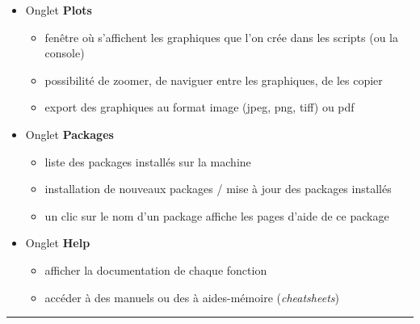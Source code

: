 \documentclass[
  french,
  10pt,
  a4paper,
]{article}
\providecommand{\tightlist}{%
  \setlength{\itemsep}{0pt}\setlength{\parskip}{0pt}}
\begin{document}
\begin{itemize}
\item
  Onglet \textbf{Plots}

  \begin{itemize}
  \tightlist
  \item
    fenêtre où s'affichent les graphiques que l'on crée dans les scripts
    (ou la console)
  \item
    possibilité de zoomer, de naviguer entre les graphiques, de les
    copier
  \item
    export des graphiques au format image (jpeg, png, tiff) ou pdf
  \end{itemize}
\item
  Onglet \textbf{Packages}

  \begin{itemize}
  \tightlist
  \item
    liste des packages installés sur la machine
  \item
    installation de nouveaux packages / mise à jour des packages
    installés
  \item
    un clic sur le nom d'un package affiche les pages d'aide de ce
    package
  \end{itemize}
\item
  Onglet \textbf{Help}

  \begin{itemize}
  \tightlist
  \item
    afficher la documentation de chaque fonction
  \item
    accéder à des manuels ou des à aides-mémoire (\emph{cheatsheets})
  \end{itemize}
\end{itemize}

\begin{center}\rule{0.5\linewidth}{0.5pt}\end{center}
\end{document}
